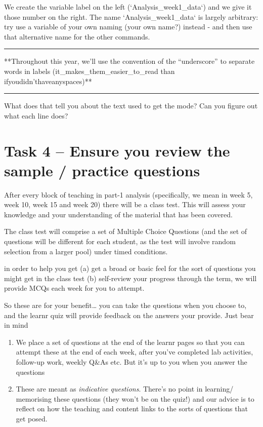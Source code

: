 \documentclass[
]{book}
\begin{document}
We create the variable label on the left (`Analysis\_week1\_data`) and
we give it those number on the right. The name `Analysis\_week1\_data`
is largely arbitrary: try use a variable of your own naming (your own
name?) instead - and then use that alternative name for the other
commands.

\begin{center}\rule{0.5\linewidth}{0.5pt}\end{center}

**Throughout this year, we'll use the convention of the ``underscore''
to separate words in labels (it\_makes\_them\_easier\_to\_read than
ifyoudidn'thaveanyspaces)**

\begin{center}\rule{0.5\linewidth}{0.5pt}\end{center}

What does that tell you about the text used to get the mode? Can you figure out what each line does?

\hypertarget{task-4-ensure-you-review-the-sample-practice-questions}{%
\section{Task 4 -- Ensure you review the sample / practice questions}\label{task-4-ensure-you-review-the-sample-practice-questions}}

After every block of teaching in part-1 analysis (specifically, we mean
in week 5, week 10, week 15 and week 20) there will be a class test.
This will assess your knowledge and your understanding of the material
that has been covered.

The class test will comprise a set of Multiple Choice Questions (and the
set of questions will be different for each student, as the test will
involve random selection from a larger pool) under timed conditions.

in order to help you get (a) get a broad or basic feel for the sort of
questions you might get in the class test (b) self-review your progress
through the term, we will provide MCQs each week for you to attempt.

So these are for your benefit\ldots{} you can take the questions when you choose to, and the learnr quiz will provide feedback on the answers your
provide. Just bear in mind

\begin{enumerate}
\def\labelenumi{\alph{enumi})}
\item
  We place a set of questions at the end of the learnr pages so that
  you can attempt these at the end of each week, after you've
  completed lab activities, follow-up work, weekly Q\&As etc. But it's up to you when you answer the questions
\item
  These are meant as \emph{indicative questions}. There's no point in learning/ memorising these questions (they won't be on the quiz!) and our advice is to reflect on how the teaching and content links to the sorts of questions that get posed.
\end{enumerate}
\end{document}
